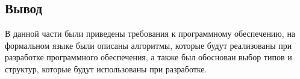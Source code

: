 \subsection{Вывод}

В данной части были приведены требования к программному обеспечению, на формальном языке были описаны алгоритмы, которые будут реализованы при разработке программного обеспечения, а также был обоснован выбор типов и структур, которые будут использованы при разработке. %
